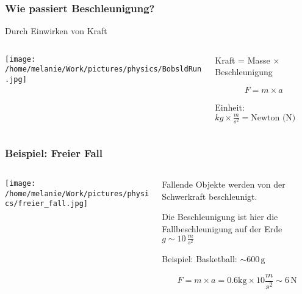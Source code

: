 \documentclass{beamer}
\begin{document}
\begin{frame}
\frametitle{Wie passiert Beschleunigung?}

Durch Einwirken von Kraft 

\begin{columns}[c]


\begin{column}{5cm}

\begin{center}
\texttt{[image: /home/melanie/Work/pictures/physics/BobsldRun.jpg]}
\end{center}


\end{column}

\begin{column}{6cm}


Kraft = Masse \(\times\) Beschleunigung 

\[F = m\times a\]

Einheit: \(kg\times\frac{m}{s^2} = \text{Newton (N)}\)


\end{column}

\end{columns}


\end{frame}

\begin{frame}
\frametitle{Beispiel: Freier Fall}


\begin{columns}[c]

\begin{column}{2cm}

\begin{center}
\texttt{[image: /home/melanie/Work/pictures/physics/freier\_fall.jpg]}
\end{center}


\end{column}



\begin{column}{8cm}
Fallende Objekte werden von der Schwerkraft beschleunigt. 

Die Beschleunigung ist hier die Fallbeschleunigung auf der Erde \(g \sim 10\,\frac{m}{s^2}\) \\[0.5 cm]

\pause

Beispiel: Basketball: \(\sim 600\,\text{g}\)

 
\pause

\[F = m\times a = 0.6\text{kg} \times 10 \frac{m}{s^2} \sim 6\,\text{N}\]

\end{column}





\end{columns}


\end{frame}
\end{document}
